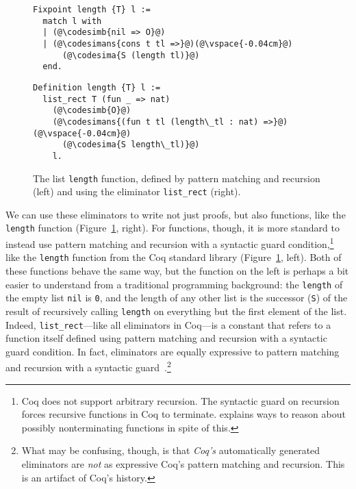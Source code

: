 \begin{figure}
\begin{minipage}{0.42\textwidth}
\begin{lstlisting}
Fixpoint length {T} l :=
  match l with
  | (@\codesimb{nil => O}@)
  | (@\codesimans{cons t tl =>}@)(@\vspace{-0.04cm}@)
      (@\codesima{S (length tl)}@)
  end.
\end{lstlisting}
\end{minipage}
\hfill
\begin{minipage}{0.54\textwidth}
\begin{lstlisting}
Definition length {T} l :=
  list_rect T (fun _ => nat)
    (@\codesimb{O}@)
    (@\codesimans{(fun t tl (length\_tl : nat) =>}@)(@\vspace{-0.04cm}@)
      (@\codesima{S length\_tl)}@)
    l.
\end{lstlisting}
\end{minipage}
\caption{The list \lstinline{length} function, defined by pattern matching and recursion (left) and using the eliminator \lstinline{list_rect} (right).}
\label{fig:length}
\end{figure}

We can use these eliminators to write not just proofs, but also functions, like the \lstinline{length} function (Figure~\ref{fig:length}, right).
For functions, though, it is more standard to instead use pattern matching and recursion with a 
syntactic guard condition,\footnote{Coq does not support arbitrary recursion. The syntactic guard on recursion forces recursive functions in Coq to terminate.  explains ways to reason about possibly nonterminating functions in spite of this.}
like the \lstinline{length} function from the Coq standard library (Figure~\ref{fig:length}, left).
Both of these functions behave the same way, but the function on the left is perhaps a bit easier to understand from a traditional programming background:
the \lstinline{length} of the empty list \lstinline{nil} is \lstinline{0}, and the length of any other list
is the successor (\lstinline{S}) of the result of recursively calling \lstinline{length} on everything but the first element of the list.
Indeed, \lstinline{list_rect}---like all eliminators in Coq---is a constant that refers to a function itself defined using pattern matching and recursion
with a syntactic guard condition.
In fact, eliminators are equally expressive to pattern matching and recursion with a syntactic guard~\cite{recursion-elimination, jesper}.\footnote{What may be confusing, though, is that \textit{Coq's} automatically 
generated eliminators are \textit{not} as expressive Coq's pattern matching and recursion. This is an artifact of Coq's history.}

